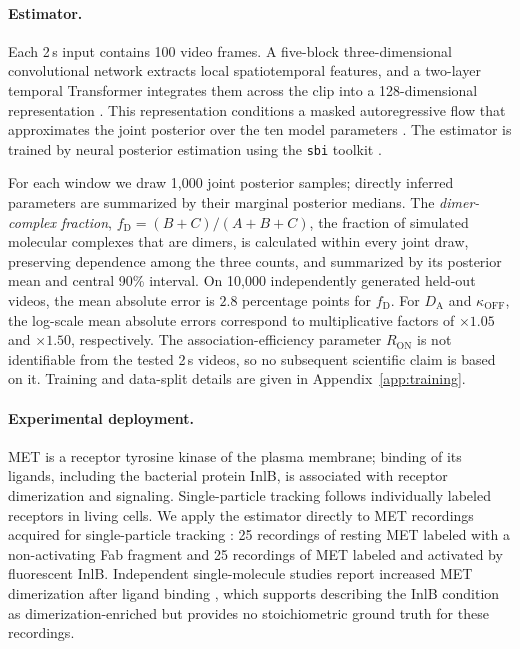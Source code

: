\documentclass{article}
\newcommand{\fD}{f_{\mathrm{D}}}
\newcommand{\DA}{D_{\mathrm{A}}}
\newcommand{\koff}{\kappa_{\mathrm{OFF}}}
\begin{document}
\paragraph{Estimator.} Each 2\,s input contains 100 video frames. A
five-block three-dimensional convolutional network extracts local
spatiotemporal features, and a two-layer temporal Transformer integrates
them across the clip into a 128-dimensional representation
\citep{vaswani2017attention}. This representation conditions a masked
autoregressive flow that approximates the joint posterior over the ten model
parameters \citep{papamakarios2017masked}. The estimator is trained by neural
posterior estimation \citep{greenberg2019automatic} using the \texttt{sbi}
toolkit \citep{boelts2025sbi}.

For each window we draw 1,000 joint posterior samples; directly inferred
parameters are summarized by their marginal posterior medians. The
\emph{dimer-complex fraction}, $\fD=(B+C)/(A+B+C)$, the fraction of simulated
molecular complexes that are dimers, is calculated within every joint draw,
preserving dependence among the three counts, and summarized by its
posterior mean and central 90\% interval. On 10,000 independently generated held-out videos, the mean
absolute error is $2.8$ percentage points for $\fD$. For $\DA$ and $\koff$,
the log-scale mean absolute errors correspond to multiplicative factors of
$\times1.05$ and $\times1.50$, respectively. The association-efficiency
parameter $R_{\mathrm{ON}}$ is not identifiable from the tested 2\,s videos,
so no subsequent scientific claim is based on it. Training and data-split
details are given in Appendix~\ref{app:training}.

\paragraph{Experimental deployment.} MET is a receptor tyrosine kinase of
the plasma membrane; binding of its ligands, including the bacterial protein
InlB, is associated with receptor dimerization and signaling. Single-particle
tracking follows individually labeled receptors in living cells. We apply
the estimator directly to MET recordings acquired for single-particle tracking
\citep{harwardt2017membrane}: 25 recordings of resting MET labeled with a
non-activating Fab fragment and 25 recordings of MET labeled and activated by
fluorescent InlB. Independent single-molecule studies report increased MET
dimerization after ligand binding \citep{dietz2013single,baldering2021crispr},
which supports describing the InlB condition as dimerization-enriched but
provides no stoichiometric ground truth for these recordings.
\end{document}
